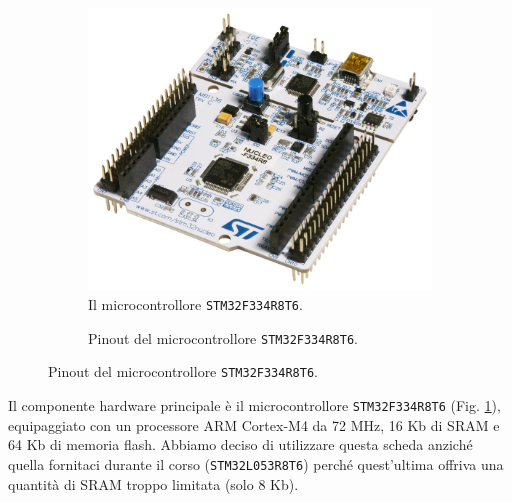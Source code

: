\documentclass[a4paper]{article}
\begin{document}
\begin{figure}[h!t]
    \begin{subfigure}[b]{0.45\textwidth}
        \begin{center}
            \includegraphics[scale=0.15]{figures/stm32f334.jpg}
        \end{center}
        \caption{Il microcontrollore \texttt{STM32F334R8T6}.}
        \label{fig:stm32f334}
    \end{subfigure}
    \hfill
    \begin{subfigure}[b]{0.45\textwidth}
        \begin{center}
            \begin{tikzpicture}[x=0.015cm, y=0.015cm, scale=0.50, transform shape]
                
            \end{tikzpicture}
        \end{center}
        \caption{Pinout del microcontrollore \texttt{STM32F334R8T6}.}
        \label{fig:pinout_stm32}
    \end{subfigure}
\end{figure}

Il componente hardware principale è il microcontrollore \texttt{STM32F334R8T6}
(Fig. \ref{fig:stm32f334}), equipaggiato con un processore ARM Cortex-M4
da 72 MHz, 16 Kb di SRAM e 64 Kb di memoria flash. Abbiamo deciso di utilizzare
questa scheda anziché quella fornitaci durante il corso (\texttt{STM32L053R8T6})
perché quest'ultima offriva una quantità di SRAM troppo limitata (solo 8 Kb).
\end{document}
